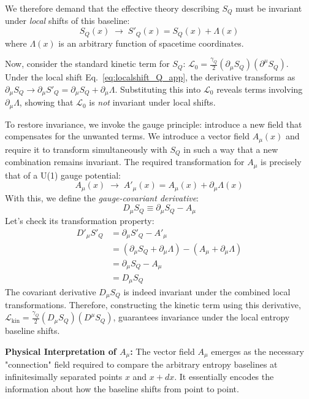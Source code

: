 \documentclass[11pt]{article}
\begin{document}
We therefore demand that the effective theory describing $S_Q$ must be invariant under \emph{local} shifts of this baseline:
\begin{equation}
S_Q(x) \;\longrightarrow\; S'_Q(x) = S_Q(x) + \Lambda(x) \label{eq:localshift_Q_app}
\end{equation}
where $\Lambda(x)$ is an arbitrary function of spacetime coordinates.

Now, consider the standard kinetic term for $S_Q$: $\mathcal{L}_0 = \frac{\gamma_Q}{2} (\partial_\mu S_Q)(\partial^\mu S_Q)$. Under the local shift Eq.~\eqref{eq:localshift_Q_app}, the derivative transforms as $\partial_\mu S_Q \to \partial_\mu S'_Q = \partial_\mu S_Q + \partial_\mu \Lambda$. Substituting this into $\mathcal{L}_0$ reveals terms involving $\partial_\mu \Lambda$, showing that $\mathcal{L}_0$ is \emph{not} invariant under local shifts.

To restore invariance, we invoke the gauge principle: introduce a new field that compensates for the unwanted terms. We introduce a vector field $A_\mu(x)$ and require it to transform simultaneously with $S_Q$ in such a way that a new combination remains invariant. The required transformation for $A_\mu$ is precisely that of a U(1) gauge potential:
\begin{equation*}
A_\mu(x) \;\longrightarrow\; A'_\mu(x) = A_\mu(x) + \partial_\mu \Lambda(x)
\end{equation*}
With this, we define the \emph{gauge-covariant derivative}:
\begin{equation*}
D_\mu S_Q \equiv \partial_\mu S_Q - A_\mu
\end{equation*}
Let's check its transformation property:
\begin{align*}
D'_\mu S'_Q &= \partial_\mu S'_Q - A'_\mu \\
&= (\partial_\mu S_Q + \partial_\mu \Lambda) - (A_\mu + \partial_\mu \Lambda) \\
&= \partial_\mu S_Q - A_\mu \\
&= D_\mu S_Q
\end{align*}
The covariant derivative $D_\mu S_Q$ is indeed invariant under the combined local transformations. Therefore, constructing the kinetic term using this derivative, $\mathcal{L}_{\mathrm{kin}} = \frac{\gamma_Q}{2} (D_\mu S_Q)(D^\mu S_Q)$, guarantees invariance under the local entropy baseline shifts.

\textbf{Physical Interpretation of $A_\mu$:} The vector field $A_\mu$ emerges as the necessary "connection" field required to compare the arbitrary entropy baselines at infinitesimally separated points $x$ and $x+dx$. It essentially encodes the information about how the baseline shifts from point to point.
\end{document}

